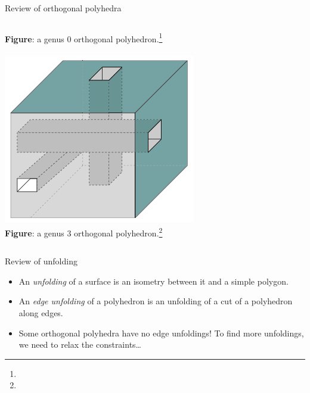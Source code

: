 \documentclass[handout]{beamer}
\theoremstyle{plain}
\begin{document}
\begin{frame}{Review of orthogonal polyhedra}
\begin{columns}
\begin{column}{.2\textwidth}
\begin{center}
          \tiny\textbf{Figure}: a genus 0 orthogonal polyhedron.\footnote[frame]{}\\
          \; \\
          \includegraphics[width=.8\textwidth]{./figs/genus_3_orthogonal_polyhedron.png}\\
          \tiny\textbf{Figure}: a genus 3 orthogonal polyhedron.\footnote[frame]{}
        \end{center}
      \end{column}
    \end{columns}
  \end{frame}

  \begin{frame}{Review of unfolding}
    \begin{itemize}
      \item An \emph{unfolding} of a surface is an isometry between it and a simple polygon.
      \pause \item An \emph{edge unfolding} of a polyhedron is an unfolding of a cut of a polyhedron along edges.
      \pause \item Some orthogonal polyhedra have no edge unfoldings!
        To find more unfoldings, we need to relax the constraints\ldots 
    \end{itemize}
  \end{frame}
\end{document}

